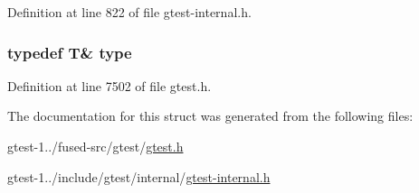 \-Definition at line 822 of file gtest-\/internal.\-h.

\hypertarget{structtesting_1_1internal_1_1AddReference_a08e05528fbb401bd8299a21d67d13ee3}{
\subsubsection[{type}]{\setlength{\rightskip}{0pt plus 5cm}typedef \-T\& {\bf type}}}\label{d6/dc0/structtesting_1_1internal_1_1AddReference_a08e05528fbb401bd8299a21d67d13ee3}


\-Definition at line 7502 of file gtest.\-h.



\-The documentation for this struct was generated from the following files\-:\begin{DoxyCompactItemize}
\item 
gtest-\/1../fused-\/src/gtest/\hyperlink{fused-src_2gtest_2gtest_8h}{gtest.\-h}\item 
gtest-\/1../include/gtest/internal/\hyperlink{gtest-internal_8h}{gtest-\/internal.\-h}\end{DoxyCompactItemize}

